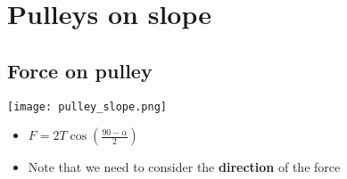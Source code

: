 \section{Pulleys on slope}
\subsection{Force on pulley}
\texttt{[image: pulley\_slope.png]}
\begin{itemize}
    \item $F=2T\cos\left(\frac{90-\alpha}{2}\right)$
    \item Note that we need to consider the \textbf{direction} of the force
\end{itemize}
